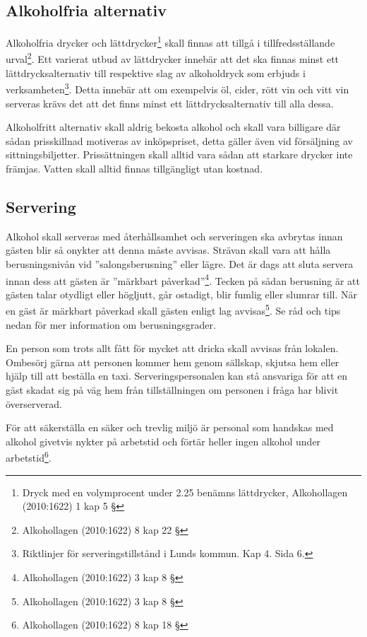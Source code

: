 \documentclass[]{dsekprotokoll}
\begin{document}
\subsection{Alkoholfria alternativ}
Alkoholfria drycker och lättdrycker\footnote{Dryck med en volymprocent under 2.25 benämns lättdrycker, Alkohollagen (2010:1622) 1 kap 5 §} skall finnas att tillgå i tillfredsställande urval\footnote{Alkohollagen (2010:1622) 8 kap 22 §}. Ett varierat utbud av lättdrycker innebär att det ska finnas minst ett lättdrycksalternativ till respektive slag av alkoholdryck som erbjuds i verksamheten\footnote{Riktlinjer för serveringstillstånd i Lunds kommun. Kap 4. Sida 6.}. Detta innebär att om exempelvis öl, cider, rött
vin och vitt vin serveras krävs det att det finns minst ett lättdrycksalternativ till alla dessa.

Alkoholfritt alternativ skall aldrig bekosta alkohol och skall vara billigare där sådan prisskillnad motiveras av inköpspriset, detta gäller även vid försäljning av sittningsbiljetter. Prissättningen skall alltid vara sådan att starkare drycker inte främjas. Vatten skall alltid finnas tillgängligt utan kostnad.

\subsection{Servering}

Alkohol skall serveras med återhållsamhet och serveringen ska avbrytas innan gästen blir så
onykter att denna måste avvisas. Strävan skall vara att hålla berusningsnivån vid ''salongsberusning'' eller lägre. Det är dags att sluta servera innan dess att gästen är ''märkbart påverkad''\footnote{Alkohollagen (2010:1622) 3 kap 8 §
}. Tecken på sådan berusning är att gästen talar otydligt eller högljutt, går ostadigt, blir fumlig eller slumrar till. När en gäst är märkbart påverkad skall gästen enligt lag avvisas\footnote{Alkohollagen (2010:1622) 3 kap 8 §}. Se råd och tips nedan för mer information om berusningsgrader.

En person som trots allt fått för mycket att dricka skall avvisas från lokalen. Ombesörj gärna att personen kommer hem genom sällskap, skjutsa hem eller hjälp till att beställa en taxi. Serveringspersonalen kan stå ansvariga för att en gäst skadat sig på väg hem från tillställningen om personen i fråga har blivit överserverad.

För att säkerställa en säker och trevlig miljö är personal som handskas med alkohol givetvis nykter på arbetstid och förtär heller ingen alkohol under arbetstid\footnote{Alkohollagen (2010:1622) 8 kap 18 §}.
\end{document}
